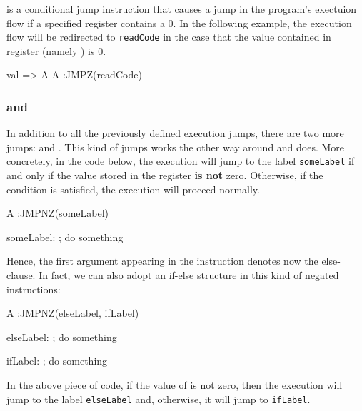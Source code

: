 \subsubsection{\JMPZ} %

\JMPZ is a conditional jump instruction that causes a jump in the program's exectuion flow if a specified register contains a 0. In the following example, the execution flow will be redirected to \texttt{readCode} in the case that the value contained in register \A (namely \val) is $0$.

\begin{zkasm}
val => A
A                   :JMPZ(readCode)
\end{zkasm}






\subsubsection{\JMPNC and \JMPNZ}

In addition to all the previously defined execution jumps, there are two more jumps: \JMPNC and \JMPNZ. This kind of jumps works the other way around \JMPC and \JMPZ does. More concretely, in the code below, the execution will jump to the label \texttt{someLabel} if and only if the value stored in the register \A \textbf{is not} zero. Otherwise, if the condition is satisfied, the execution will proceed normally.
\begin{zkasm}

A			:JMPNZ(someLabel)


someLabel:
    ; do something
\end{zkasm}

Hence, the first argument appearing in the instruction denotes now the else-clause. In fact, we can also adopt an if-else structure in this kind of negated instructions:

\begin{zkasm}

A			:JMPNZ(elseLabel, ifLabel)

elseLabel:
    ; do something
    
ifLabel:
    ; do something
\end{zkasm}

In the above piece of code, if the value of \A is not zero, then the execution will jump to the label \texttt{elseLabel} and, otherwise, it will jump to \texttt{ifLabel}. 



